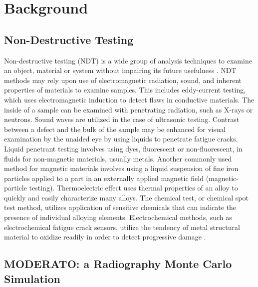 
\chapter{Background} %

\label{Chapter2} %




\section{Non-Destructive Testing}
Non-destructive testing (NDT) is a wide group of analysis techniques to examine an object, material or system without impairing its future usefulness \citep{Reference7}. NDT methods may rely upon use of electromagnetic radiation, sound, and inherent properties of materials to examine samples. This includes eddy-current testing, which uses electromagnetic induction to detect flaws in conductive materials. The inside of a sample can be examined with penetrating radiation, such as X-rays or neutrons. Sound waves are utilized in the case of ultrasonic testing. Contrast between a defect and the bulk of the sample may be enhanced for visual examination by the unaided eye by using liquids to penetrate fatigue cracks. Liquid penetrant testing involves using dyes, fluorescent or non-fluorescent, in fluids for non-magnetic materials, usually metals. Another commonly used method for magnetic materials involves using a liquid suspension of fine iron particles applied to a part in an externally applied magnetic field (magnetic-particle testing). Thermoelectric effect uses thermal properties of an alloy to quickly and easily characterize many alloys. The chemical test, or chemical spot test method, utilizes application of sensitive chemicals that can indicate the presence of individual alloying elements. Electrochemical methods, such as electrochemical fatigue crack sensors, utilize the tendency of metal structural material to oxidize readily in order to detect progressive damage \citep{Reference8}.


\section{MODERATO: a Radiography Monte Carlo Simulation}

